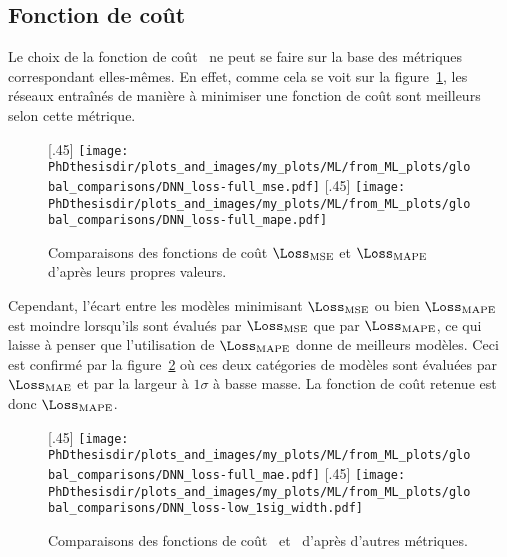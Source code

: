 \subsection{Fonction de coût}
Le choix de la fonction de coût \Loss\ ne peut se faire sur la base des métriques correspondant elles-mêmes.
En effet, comme cela se voit sur la figure~\ref{fig-loss_mse_mape_themselves},
les réseaux entraînés de manière à minimiser une fonction de coût sont meilleurs selon cette métrique.
\begin{figure}[h]
\centering

\subcaptionbox{}[.45\textwidth]
{\texttt{[image: \\PhDthesisdir/plots\_and\_images/my\_plots/ML/from\_ML\_plots/global\_comparisons/DNN\_loss-full\_mse.pdf]}\vspace{-\baselineskip}}
\hfill
\subcaptionbox{}[.45\textwidth]
{\texttt{[image: \\PhDthesisdir/plots\_and\_images/my\_plots/ML/from\_ML\_plots/global\_comparisons/DNN\_loss-full\_mape.pdf]}\vspace{-\baselineskip}}

\caption{Comparaisons des fonctions de coût $\Loss_\text{MSE}$ et $\Loss_\text{MAPE}$ d'après leurs propres valeurs.}
\label{fig-loss_mse_mape_themselves}
\end{figure}
\par
Cependant, l'écart entre les modèles minimisant $\Loss_\text{MSE}$ ou bien $\Loss_\text{MAPE}$
est moindre lorsqu'ils sont évalués par $\Loss_\text{MSE}$ que par $\Loss_\text{MAPE}$,
ce qui laisse à penser que l'utilisation de $\Loss_\text{MAPE}$ donne de meilleurs modèles.
Ceci est confirmé par la figure~\ref{fig-loss_mse_mape_by_mae_and_low_1sigma} où ces deux catégories de modèles sont évaluées par $\Loss_\text{MAE}$ et par la largeur à $1\sigma$ à basse masse.
La fonction de coût retenue est donc $\Loss_\text{MAPE}$.
\begin{figure}[h]
\centering

\subcaptionbox{}[.45\textwidth]
{\texttt{[image: \\PhDthesisdir/plots\_and\_images/my\_plots/ML/from\_ML\_plots/global\_comparisons/DNN\_loss-full\_mae.pdf]}\vspace{-\baselineskip}}
\hfill
\subcaptionbox{}[.45\textwidth]
{\texttt{[image: \\PhDthesisdir/plots\_and\_images/my\_plots/ML/from\_ML\_plots/global\_comparisons/DNN\_loss-low\_1sig\_width.pdf]}\vspace{-\baselineskip}}

\caption{Comparaisons des fonctions de coût \LossMSE\ et \LossMAPE\ d'après d'autres métriques.}
\label{fig-loss_mse_mape_by_mae_and_low_1sigma}
\end{figure}
\newpage
